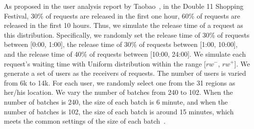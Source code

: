 As proposed in the user analysis report by Taobao~\cite{analysis}, in the Double 11 Shopping Festival, 30\% of requests are released in the first one hour, 60\% of requests are released in the first 10 hours. Thus, we simulate the release time of a request as this distribution. Specifically, we randomly set the release time of 30\% of requests between [0:00, 1:00], the release time of 30\% of requests between [1:00, 10:00], and the release time of 40\% of requests between [10:00, 24:00]. We simulate each request's waiting time with Uniform distribution within the range [$rw^-$, $rw^+$]. We generate a set of users as the receivers of requests. The number of users is varied from 6k to 14k. For each user, we randomly select one from the 31 regions as her/his location. We vary the number of batches from 240 to 102. When the number of batches is 240, the size of each batch is 6 minute, and when the number of batches is 102, the size of each batch is around 15 minutes, which meets the common settings of the size of each batch~\cite{chen2020fair}.

